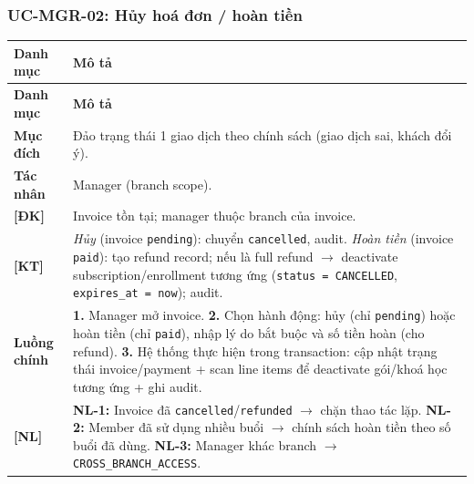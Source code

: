 \subsubsection{UC-MGR-02: Hủy hoá đơn / hoàn tiền}
\begingroup
\renewcommand{\arraystretch}{1.3}
\begin{longtable}{|>{\centering\arraybackslash}m{3cm}|>{\raggedright\arraybackslash}m{12cm}|}
\hline
\textbf{Danh mục} & \textbf{Mô tả} \\ \hline
\endfirsthead
\hline
\textbf{Danh mục} & \textbf{Mô tả} \\ \hline
\endhead
\hline
\endfoot
\textbf{Mục đích} & Đảo trạng thái 1 giao dịch theo chính sách (giao dịch sai, khách đổi ý). \\
\hline
\textbf{Tác nhân} & Manager (branch scope). \\
\hline
\textbf{[ĐK]} & Invoice tồn tại; manager thuộc branch của invoice. \\
\hline
\textbf{[KT]} & \emph{Hủy} (invoice \texttt{pending}): chuyển \texttt{cancelled}, audit. \emph{Hoàn tiền} (invoice \texttt{paid}): tạo refund record; nếu là full refund $\rightarrow$ deactivate subscription/enrollment tương ứng (\texttt{status = CANCELLED}, \texttt{expires\_at = now}); audit. \\
\hline
\textbf{Luồng chính} & \textbf{1.} Manager mở invoice. \textbf{2.} Chọn hành động: hủy (chỉ \texttt{pending}) hoặc hoàn tiền (chỉ \texttt{paid}), nhập lý do bắt buộc và số tiền hoàn (cho refund). \textbf{3.} Hệ thống thực hiện trong transaction: cập nhật trạng thái invoice/payment + scan line items để deactivate gói/khoá học tương ứng + ghi audit. \\
\hline
\textbf{[NL]} & \textbf{NL-1:} Invoice đã \texttt{cancelled}/\texttt{refunded} $\rightarrow$ chặn thao tác lặp. \textbf{NL-2:} Member đã sử dụng nhiều buổi $\rightarrow$ chính sách hoàn tiền theo số buổi đã dùng. \textbf{NL-3:} Manager khác branch $\rightarrow$ \texttt{CROSS\_BRANCH\_ACCESS}. \\
\hline
\end{longtable}
\endgroup

